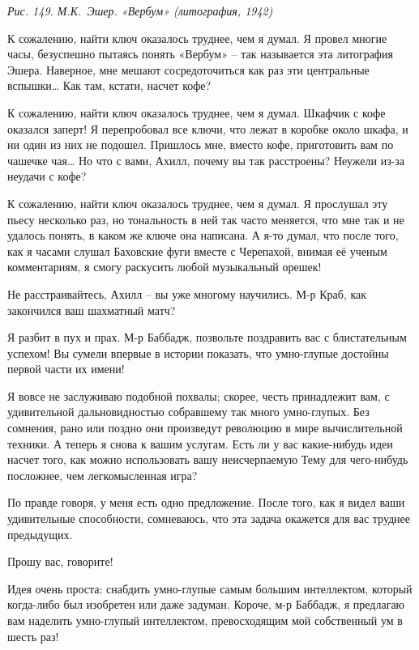 \documentclass[../main.tex]{subfiles}
\begin{document}
\begin{dialogue}
\emph{Рис. 149. М.К.~Эшер. «Вербум» (литография, 1942)}

 К сожалению, найти ключ оказалось труднее, чем я думал. Я провел многие часы, безуспешно пытаясь понять «Вербум» \--- так называется эта литография Эшера. Наверное, мне мешают сосредоточиться как раз эти центральные вспышки\ldots{} Как там, кстати, насчет кофе?

 К сожалению, найти ключ оказалось труднее, чем я думал. Шкафчик с кофе оказался заперт! Я перепробовал все ключи, что лежат в коробке около шкафа, и ни один из них не подошел. Пришлось мне, вместо кофе, приготовить вам по чашечке чая\ldots{} Но что с вами, Ахилл, почему вы так расстроены? Неужели из-за неудачи с кофе?

 К сожалению, найти ключ оказалось труднее, чем я думал. Я прослушал эту пьесу несколько раз, но тональность в ней так часто меняется, что мне так и не удалось понять, в каком же ключе она написана. А я-то думал, что после того, как я часами слушал Баховские фуги вместе с Черепахой, внимая её ученым комментариям, я смогу раскусить любой музыкальный орешек!

 Не расстраивайтесь, Ахилл \--- вы уже многому научились. М-р Краб, как закончился ваш шахматный матч?

 Я разбит в пух и прах. М-р Баббадж, позвольте поздравить вас с блистательным успехом! Вы сумели впервые в истории показать, что умно-глупые достойны первой части их имени!

 Я вовсе не заслуживаю подобной похвалы; скорее, честь принадлежит вам, с удивительной дальновидностью собравшему так много умно-глупых. Без сомнения, рано или поздно они произведут революцию в мире вычислительной техники. А теперь я снова к вашим услугам. Есть ли у вас какие-нибудь идеи насчет того, как можно использовать вашу неисчерпаемую Тему для чего-нибудь посложнее, чем легкомысленная игра?

 По правде говоря, у меня есть одно предложение. После того, как я видел ваши удивительные способности, сомневаюсь, что эта задача окажется для вас труднее предыдущих.

 Прошу вас, говорите!

 Идея очень проста: снабдить умно-глупые самым большим интеллектом, который когда-либо был изобретен или даже задуман. Короче, м-р Баббадж, я предлагаю вам наделить умно-глупый интеллектом, превосходящим мой собственный ум в шесть раз!


\end{dialogue}
\end{document}
